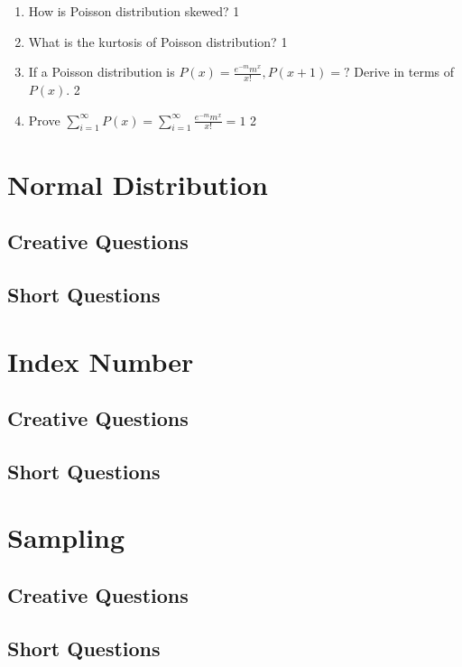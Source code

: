 \documentclass[a4paper,oneside, margin=1.4in]{book}
\begin{document}
\begin{enumerate}
\item How is Poisson distribution skewed? \hfill 1

\item What is the kurtosis of Poisson distribution? \hfill 1

\item If a Poisson distribution is $P(x) = \frac{e^{-m}m^x}{x!}, P(x+1) = ?$ Derive in terms of $P(x)$. \hfill 2

\item Prove $\displaystyle \sum_{i=1}^{\infty} P(x) = \sum_{i=1}^{\infty} \frac{e^{-m} m^x}{x!} = 1$ \hfill 2
\end{enumerate}


\chapter{Normal Distribution} 
\section{Creative Questions}


\section{Short Questions}

\chapter{Index Number} 
\section{Creative Questions}


\section{Short Questions}

\chapter{Sampling} 
\section{Creative Questions}


\section{Short Questions}
\end{document}
